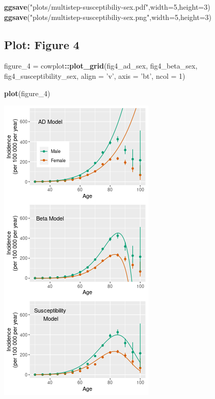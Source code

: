 \documentclass[
]{article}
\newenvironment{Shaded}{\begin{snugshade}}{\end{snugshade}}
\newcommand{\DataTypeTok}[1]{\textcolor[rgb]{0.13,0.29,0.53}{#1}}
\newcommand{\DecValTok}[1]{\textcolor[rgb]{0.00,0.00,0.81}{#1}}
\newcommand{\KeywordTok}[1]{\textcolor[rgb]{0.13,0.29,0.53}{\textbf{#1}}}
\newcommand{\NormalTok}[1]{#1}
\newcommand{\OperatorTok}[1]{\textcolor[rgb]{0.81,0.36,0.00}{\textbf{#1}}}
\newcommand{\StringTok}[1]{\textcolor[rgb]{0.31,0.60,0.02}{#1}}
\begin{document}
\begin{Shaded}
\begin{Highlighting}[]
\KeywordTok{ggsave}\NormalTok{(}\StringTok{"plots/multistep-susceptibiliy-sex.pdf"}\NormalTok{,}\DataTypeTok{width=}\DecValTok{5}\NormalTok{,}\DataTypeTok{height=}\DecValTok{3}\NormalTok{)}
\KeywordTok{ggsave}\NormalTok{(}\StringTok{"plots/multistep-susceptibiliy-sex.png"}\NormalTok{,}\DataTypeTok{width=}\DecValTok{5}\NormalTok{,}\DataTypeTok{height=}\DecValTok{3}\NormalTok{)}
\end{Highlighting}
\end{Shaded}

\hypertarget{plot-figure-4}{%
\subsection{Plot: Figure 4}\label{plot-figure-4}}

\begin{Shaded}
\begin{Highlighting}[]
\NormalTok{figure_}\DecValTok{4}\NormalTok{ =}\StringTok{ }\NormalTok{cowplot}\OperatorTok{::}\KeywordTok{plot_grid}\NormalTok{(fig4_ad_sex,}
\NormalTok{                              fig4_beta_sex,}
\NormalTok{                              fig4_susceptibility_sex,}
                              \DataTypeTok{align =} \StringTok{'v'}\NormalTok{,}
                              \DataTypeTok{axis =} \StringTok{'bt'}\NormalTok{, }\DataTypeTok{ncol =} \DecValTok{1}\NormalTok{)}

\KeywordTok{plot}\NormalTok{(figure_}\DecValTok{4}\NormalTok{)}
\end{Highlighting}
\end{Shaded}

\includegraphics{multistep-model-comparison_files/figure-latex/figure4-1.png}
\end{document}
